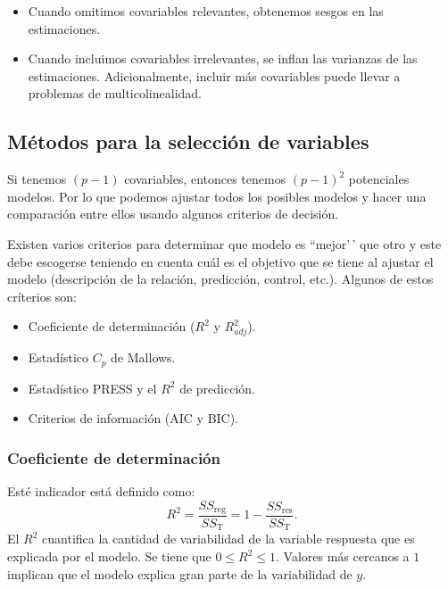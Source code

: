 \documentclass[
]{article}
\providecommand{\tightlist}{%
  \setlength{\itemsep}{0pt}\setlength{\parskip}{0pt}}
\begin{document}
\begin{itemize}
\item
  Cuando omitimos covariables relevantes, obtenemos sesgos en las estimaciones.
\item
  Cuando incluimos covariables irrelevantes, se inflan las varianzas de las estimaciones. Adicionalmente, incluir más covariables puede llevar a problemas de multicolinealidad.
\end{itemize}

\hypertarget{muxe9todos-para-la-selecciuxf3n-de-variables}{%
\subsection{Métodos para la selección de variables}\label{muxe9todos-para-la-selecciuxf3n-de-variables}}

Si tenemos \((p-1)\) covariables, entonces tenemos \((p-1)^2\) potenciales modelos. Por lo que podemos ajustar todos los posibles modelos y hacer una comparación entre ellos usando algunos criterios de decisión.

Existen varios criterios para determinar que modelo es ``mejor'\,' que otro y este debe escogerse teniendo en cuenta cuál es el objetivo que se tiene al ajustar el modelo (descripción de la relación, predicción, control, etc.). Algunos de estos críterios son:

\begin{itemize}
\tightlist
\item
  Coeficiente de determinación (\(R^{2}\) y \(R^{2}_{adj}\)).
\item
  Estadístico \(C_{p}\) de Mallows.
\item
  Estadístico PRESS y el \(R^{2}\) de predicción.
\item
  Criterios de información (AIC y BIC).
\end{itemize}

\hypertarget{coeficiente-de-determinaciuxf3n}{%
\subsubsection{Coeficiente de determinación}\label{coeficiente-de-determinaciuxf3n}}

Esté indicador está definido como:
\[
R^{2} = \frac{SS_{\mbox{reg}}}{SS_{\mbox{T}}} = 1 - \frac{SS_{\mbox{res}}}{SS_{\mbox{T}}}.
\]
El \(R^{2}\) cuantifica la cantidad de variabilidad de la variable respuesta que es explicada por el modelo. Se tiene que \(0 \leq R^{2} \leq 1\). Valores más cercanos a \(1\) implican que el modelo explica gran parte de la variabilidad de \(y\).
\end{document}

